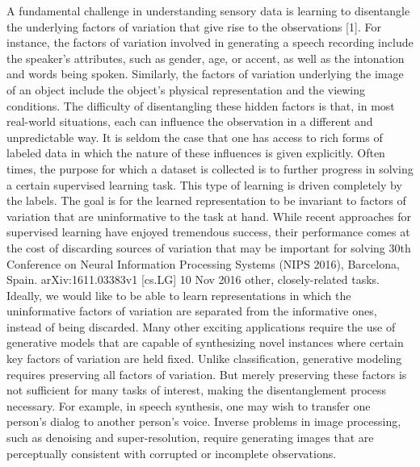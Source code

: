 A fundamental challenge in understanding sensory data is learning to disentangle the underlying
factors of variation that give rise to the observations [1]. For instance, the factors of variation involved
in generating a speech recording include the speaker’s attributes, such as gender, age, or accent, as
well as the intonation and words being spoken. Similarly, the factors of variation underlying the image
of an object include the object’s physical representation and the viewing conditions. The difficulty
of disentangling these hidden factors is that, in most real-world situations, each can influence the
observation in a different and unpredictable way. It is seldom the case that one has access to rich
forms of labeled data in which the nature of these influences is given explicitly.\cite{Mathieu2016}
Often times, the purpose for which a dataset is collected is to further progress in solving a certain
supervised learning task. This type of learning is driven completely by the labels. The goal is for
the learned representation to be invariant to factors of variation that are uninformative to the task
at hand. While recent approaches for supervised learning have enjoyed tremendous success, their
performance comes at the cost of discarding sources of variation that may be important for solving
30th Conference on Neural Information Processing Systems (NIPS 2016), Barcelona, Spain.
arXiv:1611.03383v1 [cs.LG] 10 Nov 2016\cite{Mathieu2016}
other, closely-related tasks. Ideally, we would like to be able to learn representations in which the
uninformative factors of variation are separated from the informative ones, instead of being discarded.
Many other exciting applications require the use of generative models that are capable of synthesizing
novel instances where certain key factors of variation are held fixed. Unlike classification, generative
modeling requires preserving all factors of variation. But merely preserving these factors is not
sufficient for many tasks of interest, making the disentanglement process necessary. For example,
in speech synthesis, one may wish to transfer one person’s dialog to another person’s voice. Inverse
problems in image processing, such as denoising and super-resolution, require generating images that
are perceptually consistent with corrupted or incomplete observations.\cite{Mathieu2016}
